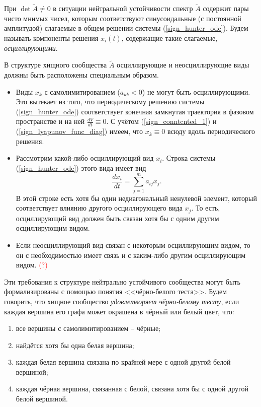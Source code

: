     При \(\det \widetilde{A} \neq 0\) в ситуации нейтральной устойчивости спектр \(\widetilde{A}\) содержит пары чисто мнимых чисел, которым соответствуют синусоидальные (с постоянной амплитудой) слагаемые в общем решении системы (\ref{sign_hunter_ode}). Будем называть компоненты решения \(x_i(t)\), содержащие такие слагаемые, \textit{осциллирующими}.
    
    В структуре хищного сообщества \(\widetilde{A}\) осциллирующие и неосциллирующие виды должны быть расположены специальным образом. 
    \begin{itemize}
        \item Виды \(x_k\) с самолимитированием (\(a_{kk} < 0\)) не могут быть осциллирующими. Это вытекает из того, что периодическому решению системы (\ref{sign_hunter_ode}) соответствует конечная замкнутая траектория в фазовом пространстве и на ней \( \frac{d V}{d t} \equiv 0 \). С учётом (\ref{sign_conntcnted_1}) и (\ref{sign_lyapunov_func_diag}) имеем, что \(x_k \equiv 0\) всюду вдоль периодического решения.
        
        \item Рассмотрим какой-либо осциллирующий вид \(x_i\). Строка системы (\ref{sign_hunter_ode}) этого вида имеет вид
        \begin{equation*}
            \frac{dx_i}{dt} = \sum_{j=1}^{m} a_{ij} x_j.
        \end{equation*}
        В этой строке есть хотя бы один недиагональный ненулевой элемент, который соответствует влиянию другого осциллирующего вида \(x_j\). То есть, осциллирующий вид должен быть связан хотя бы с одним другим осциллирующим видом.

        \item Если неосциллирующий вид связан с некоторым осциллирующим видом, то он с необходимостью имеет связь и с каким-либо другим осциллирующим видом. \textcolor{red}{(?)}
    \end{itemize}

    Эти требования к структуре нейтрально устойчивого сообщества могут быть формализированы с помощью понятия <<чёрно-белого теста>>. Будем говорить, что хищное сообщество \textit{удовлетворяет чёрно-белому тесту}, если каждая вершина его графа может окрашена в чёрный или белый цвет, что:
    \begin{enumerate}[label={\asbuk*)}, ref=\asbuk*]
        \item все вершины с самолимитированием -- чёрные; \label{black_white_a}
        \item найдётся хотя бы одна белая вершина; \label{black_white_b}
        \item каждая белая вершина связана по крайней мере с одной другой белой вершиной; \label{black_white_c}
        \item каждая чёрная вершина, связанная с белой, связана хотя бы с одной другой белой вершиной. \label{black_white_d}
    \end{enumerate}


